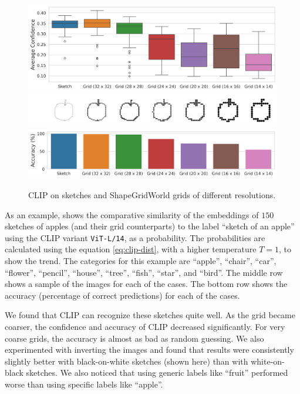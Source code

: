 \begin{figure}[h]
    \centering
    \includegraphics[width=\textwidth]{images/grid_comparison.png}
    \includegraphics[width=\textwidth]{images/grid_comparison_images.png}
    \includegraphics[width=\textwidth]{images/grid_comparison_accuracy.png}
    \caption{CLIP on sketches and ShapeGridWorld grids of different resolutions.}
    \label{fig:clip-sketches}
\end{figure}

As an example,  shows the comparative similarity of the embeddings of \(150\) sketches of apples (and their grid counterparts) to the label ``sketch of an apple'' using the CLIP variant \texttt{ViT-L/14}, as a probability.
The probabilities are calculated using the equation \eqref{eq:clip-dist}, with a higher temperature \(T = 1\), to show the trend.
The categories for this example are ``apple'', ``chair'', ``car'', ``flower'', ``pencil'', ``house'', ``tree'', ``fish'', ``star'', and ``bird''.
The middle row shows a sample of the images for each of the cases.
The bottom row shows the accuracy (percentage of correct predictions) for each of the cases.

We found that CLIP can recognize these sketches quite well.
As the grid became coarser, the confidence and accuracy of CLIP decreased significantly.
For very coarse grids, the accuracy is almost as bad as random guessing.
We also experimented with inverting the images and found that results were consistently slightly better with black-on-white sketches (shown here) than with white-on-black sketches.
We also noticed that using generic labels like ``fruit'' performed worse than using specific labels like ``apple''.

